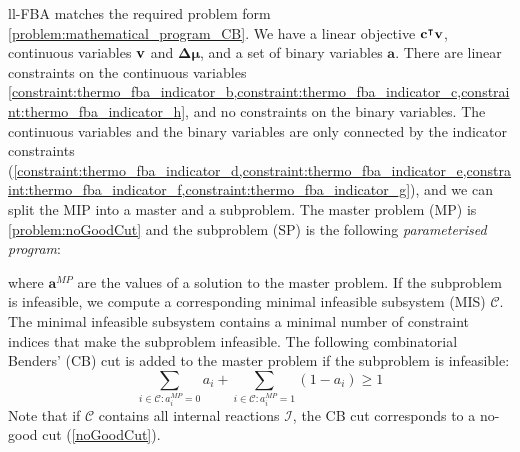 ll-FBA matches the required problem form \cref{problem:mathematical_program_CB}. We have a linear objective $\bold c^\intercal \bold v$, continuous variables $\bold v$ and $\boldsymbol{\Delta \mu}$, and a set of binary variables $\boldsymbol a$. There are linear constraints on the continuous variables \cref{constraint:thermo_fba_indicator_b,constraint:thermo_fba_indicator_c,constraint:thermo_fba_indicator_h}, and no constraints on the binary variables. The continuous variables and the binary variables are only connected by the indicator constraints (\cref{constraint:thermo_fba_indicator_d,constraint:thermo_fba_indicator_e,constraint:thermo_fba_indicator_f,constraint:thermo_fba_indicator_g}), and we can split the MIP into a master and a subproblem.
The master problem (MP) is
\cref{problem:noGoodCut}
and the subproblem (SP) is the following \textit{parameterised program}:
\quad where $\boldsymbol a^{MP}$ are the values of a solution to the master problem. If the subproblem is infeasible, we compute a corresponding minimal infeasible subsystem (MIS) $\mathcal{C}$. The minimal infeasible subsystem contains a minimal number of constraint indices that make the subproblem infeasible.
The following combinatorial Benders' (CB) cut is added to the master problem if the subproblem is infeasible:
\begin{equation*}
\sum_{i \in \mathcal{C}: a_i^{MP}=0} a_i + \sum_{i \in \mathcal{C}: a_i^{MP}=1} (1-a_i) \geq 1
\end{equation*}
Note that if $\mathcal{C}$ contains all internal reactions $\mathcal{I}$, the CB cut corresponds to a no-good cut (\cref{noGoodCut}).

